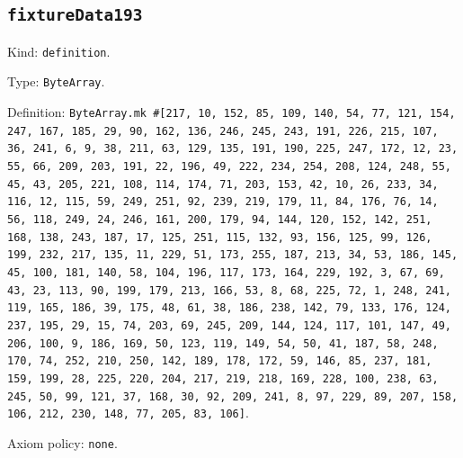 \documentclass[11pt]{article}
\begin{document}
\subsection*{\texttt{fixtureData193}}
\noindent Kind: \texttt{definition}.\par
\noindent Type: \texttt{ByteArray}.\par
\noindent Definition: \texttt{ByteArray.mk \#[217, 10, 152, 85, 109, 140, 54, 77, 121, 154, 247, 167, 185, 29, 90, 162, 136, 246, 245, 243, 191, 226, 215, 107, 36, 241, 6, 9, 38, 211, 63, 129, 135, 191, 190, 225, 247, 172, 12, 23, 55, 66, 209, 203, 191, 22, 196, 49, 222, 234, 254, 208, 124, 248, 55, 45, 43, 205, 221, 108, 114, 174, 71, 203, 153, 42, 10, 26, 233, 34, 116, 12, 115, 59, 249, 251, 92, 239, 219, 179, 11, 84, 176, 76, 14, 56, 118, 249, 24, 246, 161, 200, 179, 94, 144, 120, 152, 142, 251, 168, 138, 243, 187, 17, 125, 251, 115, 132, 93, 156, 125, 99, 126, 199, 232, 217, 135, 11, 229, 51, 173, 255, 187, 213, 34, 53, 186, 145, 45, 100, 181, 140, 58, 104, 196, 117, 173, 164, 229, 192, 3, 67, 69, 43, 23, 113, 90, 199, 179, 213, 166, 53, 8, 68, 225, 72, 1, 248, 241, 119, 165, 186, 39, 175, 48, 61, 38, 186, 238, 142, 79, 133, 176, 124, 237, 195, 29, 15, 74, 203, 69, 245, 209, 144, 124, 117, 101, 147, 49, 206, 100, 9, 186, 169, 50, 123, 119, 149, 54, 50, 41, 187, 58, 248, 170, 74, 252, 210, 250, 142, 189, 178, 172, 59, 146, 85, 237, 181, 159, 199, 28, 225, 220, 204, 217, 219, 218, 169, 228, 100, 238, 63, 245, 50, 99, 121, 37, 168, 30, 92, 209, 241, 8, 97, 229, 89, 207, 158, 106, 212, 230, 148, 77, 205, 83, 106]}.\par
\noindent Axiom policy: \texttt{none}.\par
\end{document}
